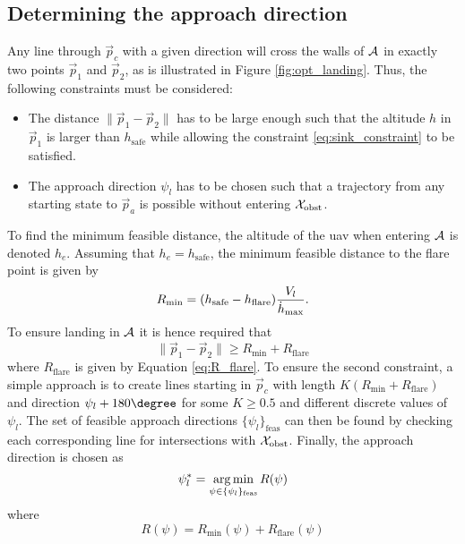 \subsection{Determining the approach direction}
Any line through $\vec{p}_c$ with a given direction will cross the walls of $\mathcal{A}$ in exactly two points $\vec{p}_1$ and $\vec{p}_2$, as is illustrated in Figure \ref{fig:opt_landing}. 
Thus, the following constraints must be considered:
\begin{itemize}
    \item The distance $\|\vec{p}_1-\vec{p}_2\|$ has to be large enough such that the altitude $h$ in $\vec{p}_1$ is larger than $h_{\text{safe}}$ while allowing 
    the constraint \eqref{eq:sink_constraint} to be satisfied.
    \item The approach direction $\psi_l$ has to be chosen such that a trajectory from any starting state to $\vec{p}_a$ is possible without entering $\mathcal{X}_{\text{obst}}$.
\end{itemize}
To find the minimum feasible distance, the altitude of the \ac{uav} when entering $\mathcal{A}$ is denoted $h_e$.
Assuming that $h_e=h_{\text{safe}}$, the minimum feasible distance to the flare point is given by
\begin{equation}
    R_{\text{min}}=(h_{\text{safe}}-h_{\text{flare}})\frac{V_l}{\dot{h}_{\text{max}}}.
\end{equation}
To ensure landing in $\mathcal{A}$ it is hence required that 
\begin{equation}
    \|\vec{p}_1-\vec{p}_2\|\geq R_{\text{min}}+R_{\text{flare}}
\end{equation}
where $R_{\text{flare}}$ is given by Equation \eqref{eq:R_flare}. To ensure the second constraint, a simple approach is to 
create lines starting in $\vec{p}_c$ with length $K(R_{\text{min}}+R_{\text{flare}})$ and direction $\psi_l+180\degree$ for some $K\geq0.5$ and different discrete values of $\psi_l$. 
The set of feasible approach directions $\{\psi_l\}_{\text{feas}}$ can then be found by checking each corresponding line for intersections with $\mathcal{X}_{\text{obst}}$. Finally, the approach direction is 
chosen as 
\begin{equation}
    \psi_l^* = \operatorname*{arg\,\text{min}}_{\psi\in\{\psi_l\}_{\text{feas}}}R(\psi)
\end{equation}
where
\begin{equation}
    R(\psi)=R_{\text{min}}(\psi) + R_{\text{flare}}(\psi)
\end{equation}

